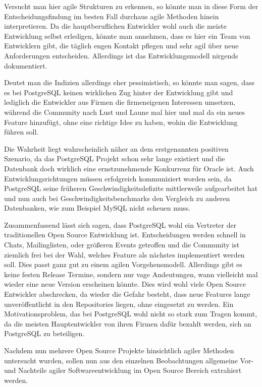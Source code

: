 Versucht man hier agile Strukturen zu erkennen, so könnte man in diese Form der Entscheidungsfindung im besten Fall durchaus agile Methoden hinein interpretieren. Da die hauptberuflichen Entwickler wohl auch die meiste Entwicklung selbst erledigen, könnte man annehmen, dass es hier ein Team von Entwicklern gibt, die täglich engen Kontakt pflegen und sehr agil über neue Anforderungen entscheiden. Allerdings ist das Entwicklungsmodell nirgends dokumentiert.

Deutet man die Indizien allerdings eher pessimistisch, so könnte man sagen, dass es bei PostgreSQL keinen wirklichen Zug hinter der Entwicklung gibt und lediglich die Entwickler aus Firmen die firmeneigenen Interessen umsetzen, während die Community nach Lust und Laune mal hier und mal da ein neues Feature hinzufügt, ohne eine richtige Idee zu haben, wohin die Entwicklung führen soll.

Die Wahrheit liegt wahrscheinlich näher an dem erstgenannten positiven Szenario, da das PostgreSQL Projekt schon sehr lange existiert und die Datenbank doch wirklich eine ernstzunehmende Konkurrenz für Oracle ist. Auch Entwicklungsrichtungen müssen erfolgreich kommuniziert worden sein, da PostgreSQL seine früheren Geschwindigkeitsdefizite mittlerweile aufgearbeitet hat und nun auch bei Geschwindigkeitsbenchmarks den Vergleich zu anderen Datenbanken, wie zum Beispiel MySQL nicht scheuen muss.

Zusammenfassend lässt sich sagen, dass PostgreSQL wohl ein Vertreter der traditionellen Open Source Entwicklung ist. Entscheidungen werden schnell in Chats, Mailinglisten, oder größeren Events getroffen und die Community ist ziemlich frei bei der Wahl, welches Feature als nächstes implementiert werden soll. Dies passt ganz gut zu einem agilen Vorgehensmodell. Allerdings gibt es keine festen Release Termine, sondern nur vage Andeutungen, wann vielleicht mal wieder eine neue Version erscheinen könnte. Dies wird wohl viele Open Source Entwickler abschrecken, da wieder die Gefahr besteht, dass neue Features lange unveröffentlicht in den Repositories liegen, ohne eingesetzt zu werden. Ein Motivationsproblem, das bei PostgreSQL wohl nicht so stark zum Tragen kommt, da die meisten Hauptentwickler von ihren Firmen dafür bezahlt werden, sich an PostgreSQL zu beteiligen.

Nachdem nun mehrere Open Source Projekte hinsichtlich agiler Methoden untersucht wurden, sollen nun aus den einzelnen Beobachtungen allgemeine Vor- und Nachteile agiler Softwareentwicklung im Open Source Bereich extrahiert werden.
